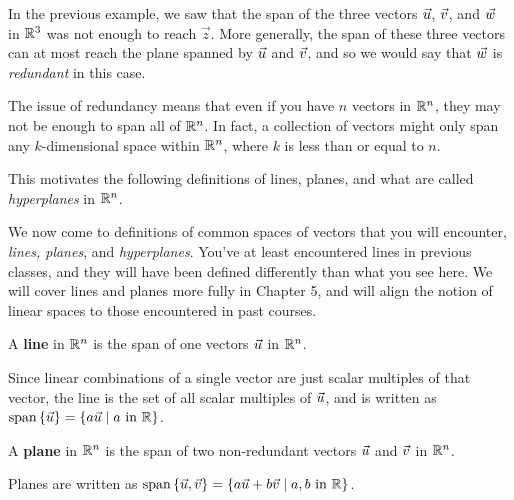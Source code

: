 \documentclass{ximera}
\begin{document}
\begin{exploration}

  In the previous example, we saw that the span of the three vectors $\vec{u}$, $\vec{v}$, and $\vec{w}$ in $\mathbb{R}^3$ was not enough to reach $\vec{z}$. More generally, the span of these three vectors can at most reach the plane spanned by $\vec{u}$ and $\vec{v}$, and so we would say that $\vec{w}$ is \emph{redundant} in this case.

  The issue of redundancy means that even if you have $n$ vectors in $\mathbb{R}^n$, they may not be enough to span all of $\mathbb{R}^n$. In fact, a collection of vectors might only span any $k$-dimensional space within $\mathbb{R}^n$, where $k$ is less than or equal to $n$.

  This motivates the following definitions of lines, planes, and what are called \emph{hyperplanes} in $\mathbb{R}^n$.

  \begin{remark}

    We now come to definitions of common spaces of vectors that you will encounter, \emph{lines, planes}, and \emph{hyperplanes}. You've at least encountered lines in previous classes, and they will have been defined differently than what you see here. We will cover lines and planes more fully in Chapter 5, and will align the notion of linear spaces to those encountered in past courses.

  \end{remark}

  \begin{definition}

    A \textbf{line} in $\mathbb{R}^n$ is the span of one vectors $\vec{u}$ in $\mathbb{R}^n$. 
    
    Since linear combinations of a single vector are just scalar multiples of that vector, the line is the set of all scalar multiples of $\vec{u}$, and is written as $\text{span}\left\{\vec{u}\right\}=\left\{a\vec{u}\mid a\text{ in }\mathbb{R}\right\}$.

  \end{definition}

  \begin{definition}

    A \textbf{plane} in $\mathbb{R}^n$ is the span of two  non-redundant vectors $\vec{u}$ and $\vec{v}$ in $\mathbb{R}^n$. 
    
    Planes are written as $\text{span}\left\{\vec{u},\vec{v}\right\}=\left\{a\vec{u}+b\vec{v}\mid a,b\text{ in }\mathbb{R}\right\}$.


\end{definition}
\end{exploration}
\end{document}
